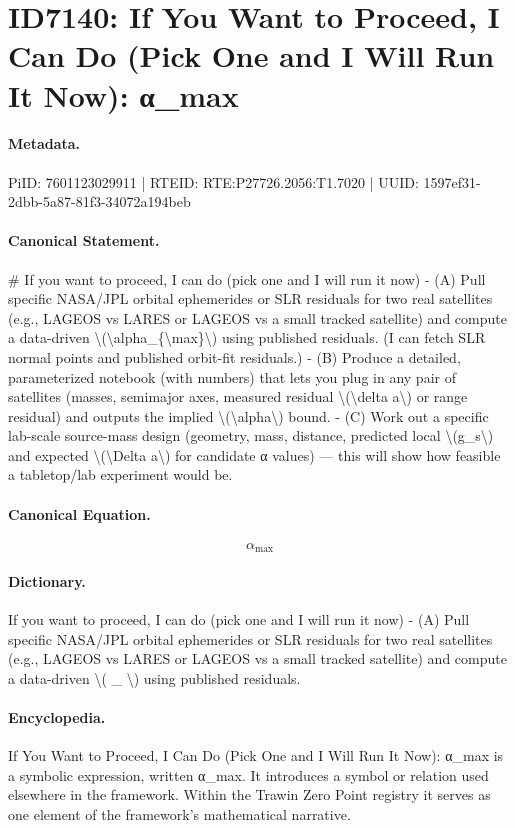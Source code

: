 \section*{ID7140: If You Want to Proceed, I Can Do (Pick One and I Will Run It Now): α\_max}
\paragraph{Metadata.}
PiID: 7601123029911 | RTEID: RTE:P27726.2056:T1.7020 | UUID: 1597ef31-2dbb-5a87-81f3-34072a194beb

\paragraph{Canonical Statement.}
\# If you want to proceed, I can do (pick one and I will run it now) - (A) Pull specific NASA/JPL orbital ephemerides or SLR residuals for two real satellites (e.g., LAGEOS vs LARES or LAGEOS vs a small tracked satellite) and compute a data-driven \textbackslash{}(\textbackslash{}alpha\_\{\textbackslash{}max\}\textbackslash{}) using published residuals. (I can fetch SLR normal points and published orbit-fit residuals.) - (B) Produce a detailed, parameterized notebook (with numbers) that lets you plug in any pair of satellites (masses, semimajor axes, measured residual \textbackslash{}(\textbackslash{}delta a\textbackslash{}) or range residual) and outputs the implied \textbackslash{}(\textbackslash{}alpha\textbackslash{}) bound. - (C) Work out a specific lab-scale source-mass design (geometry, mass, distance, predicted local \textbackslash{}(g\_s\textbackslash{}) and expected \textbackslash{}(\textbackslash{}Delta a\textbackslash{}) for candidate α values) — this will show how feasible a tabletop/lab experiment would be.

\paragraph{Canonical Equation.}
\[
\alpha_{\max}
\]

\paragraph{Dictionary.}
If you want to proceed, I can do (pick one and I will run it now) - (A) Pull specific NASA/JPL orbital ephemerides or SLR residuals for two real satellites (e.g., LAGEOS vs LARES or LAGEOS vs a small tracked satellite) and compute a data-driven \textbackslash{}( \_ \textbackslash{}) using published residuals.

\paragraph{Encyclopedia.}
If You Want to Proceed, I Can Do (Pick One and I Will Run It Now): α\_max is a symbolic expression, written α\_max. It introduces a symbol or relation used elsewhere in the framework. Within the Trawin Zero Point registry it serves as one element of the framework's mathematical narrative.
